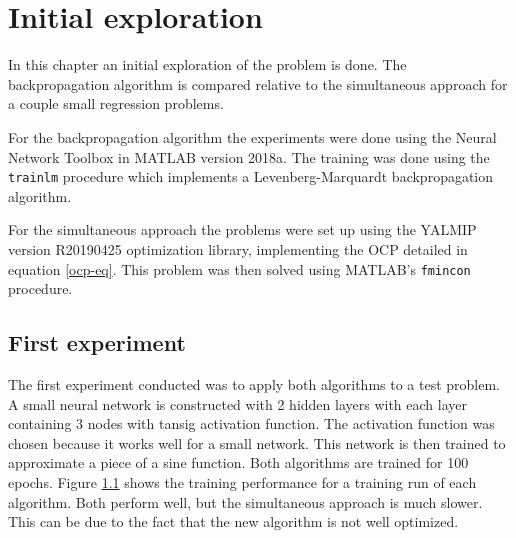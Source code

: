 
\chapter{Initial exploration}
\label{cha:1}
In this chapter an initial exploration of the problem is done. The backpropagation algorithm is compared relative to the simultaneous approach for a couple small regression problems.

For the backpropagation algorithm the experiments were done using the Neural Network Toolbox in MATLAB version 2018a. The training was done using the \texttt{trainlm} procedure which implements a Levenberg-Marquardt backpropagation algorithm.

For the simultaneous approach the problems were set up using the YALMIP version R20190425 optimization library, implementing the OCP detailed in equation \ref{ocp-eq}. This problem was then solved using MATLAB's \texttt{fmincon} procedure.

\section{First experiment}
The first experiment conducted was to apply both algorithms to a test problem. A small neural network is constructed with 2 hidden layers with each layer containing 3 nodes with tansig activation function. The activation function was chosen because it works well for a small network. This network is then trained to approximate a piece of a sine function. Both algorithms are trained for 100 epochs. Figure \ref{} shows the training performance for a training run of each algorithm. Both perform well, but the simultaneous approach is much slower. This can be due to the fact that the new algorithm is not well optimized.

